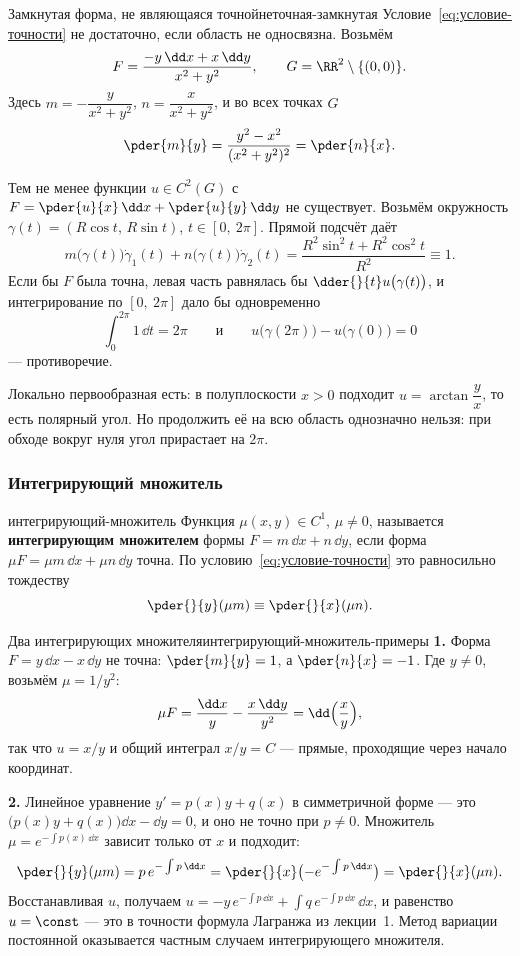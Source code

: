 \begin{Example}[addon]{Замкнутая форма, не являющаяся точной}{неточная-замкнутая}
	Условие~\eqref{eq:условие-точности} не достаточно, если область не
	односвязна. Возьмём
	\[
	F = \frac{-y\,\dd x + x\,\dd y}{x^2 + y^2}, \qquad
	G = \RR^2 \setminus \{(0,0)\}.
	\]
	Здесь $m = -\dfrac{y}{x^2+y^2}$, $n = \dfrac{x}{x^2+y^2}$, и во всех
	точках $G$
	\[
	\pder{m}{y} = \frac{y^2 - x^2}{(x^2+y^2)^2} = \pder{n}{x}.
	\]

	\medskip
	Тем не менее функции $u \in C^2(G)$ с
	$F = \pder{u}{x}\,\dd x + \pder{u}{y}\,\dd y$ не существует. Возьмём
	окружность $\gamma(t) = (R\cos t,\, R\sin t)$, $t \in [0,\ 2\pi]$. Прямой
	подсчёт даёт
	\[
	m\bigl(\gamma(t)\bigr)\dot\gamma_1(t)
	+ n\bigl(\gamma(t)\bigr)\dot\gamma_2(t)
	= \frac{R^2\sin^2 t + R^2\cos^2 t}{R^2} \equiv 1.
	\]
	Если бы $F$ была точна, левая часть равнялась бы
	$\dder{}{t} u\bigl(\gamma(t)\bigr)$, и интегрирование по $[0,\ 2\pi]$
	дало бы одновременно
	\[
	\int_0^{2\pi} 1\,\dd t = 2\pi
	\qquad\text{и}\qquad
	u\bigl(\gamma(2\pi)\bigr) - u\bigl(\gamma(0)\bigr) = 0
	\]
	--- противоречие.

	\medskip
	Локально первообразная есть: в полуплоскости $x > 0$ подходит
	$u = \arctan\dfrac{y}{x}$, то есть полярный угол. Но продолжить её на
	всю область однозначно нельзя: при обходе вокруг нуля угол прирастает
	на $2\pi$.
\end{Example}

\subsubsection*{Интегрирующий множитель}

\begin{Definition}{}{интегрирующий-множитель}
	Функция $\mu(x,y) \in C^1$, $\mu \neq 0$, называется
	\textbf{интегрирующим множителем} формы $F = m\,\dd x + n\,\dd y$, если
	форма $\mu F = \mu m\,\dd x + \mu n\,\dd y$ точна. По
	условию~\eqref{eq:условие-точности} это равносильно тождеству
	\[
	\pder{}{y}(\mu m) \equiv \pder{}{x}(\mu n).
	\]
\end{Definition}

\begin{Example}[addon]{Два интегрирующих множителя}{интегрирующий-множитель-примеры}
	\textbf{1.} Форма $F = y\,\dd x - x\,\dd y$ не точна:
	$\pder{m}{y} = 1$, а $\pder{n}{x} = -1$. Где $y \neq 0$, возьмём
	$\mu = 1/y^2$:
	\[
	\mu F = \frac{\dd x}{y} - \frac{x\,\dd y}{y^2} = \dd\Bigl(\frac{x}{y}\Bigr),
	\]
	так что $u = x/y$ и общий интеграл $x/y = C$ --- прямые, проходящие через
	начало координат.

	\medskip
	\textbf{2.} Линейное уравнение $y' = p(x)y + q(x)$ в симметричной форме --- это
	$\bigl(p(x)y + q(x)\bigr)\dd x - \dd y = 0$, и оно не точно при $p \neq 0$.
	Множитель $\mu = e^{-\int p(x)\,\dd x}$ зависит только от $x$ и подходит:
	\[
	\pder{}{y}(\mu m) = p\,e^{-\int p\,\dd x}
	= \pder{}{x}\bigl(-e^{-\int p\,\dd x}\bigr) = \pder{}{x}(\mu n).
	\]
	Восстанавливая $u$, получаем
	$u = -y\,e^{-\int p\,\dd x} + \int q\,e^{-\int p\,\dd x}\,\dd x$, и равенство
	$u = \const$ --- это в точности формула Лагранжа из лекции~1. Метод вариации
	постоянной оказывается частным случаем интегрирующего множителя.
\end{Example}

